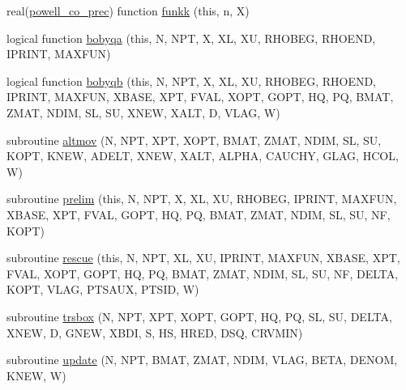 \begin{DoxyCompactItemize}
\item 
real(\mbox{\hyperlink{namespacepowell__constrainedoptimize_a18207be3e2f370a42332601cfccca22e}{powell\+\_\+co\+\_\+prec}}) function \mbox{\hyperlink{namespacepowell__constrainedoptimize_ae7f7153e98c2ba47f65f71c04dfdc6b6}{funkk}} (this, n, X)
\item 
logical function \mbox{\hyperlink{namespacepowell__constrainedoptimize_a18b806fe9f14b759021a23344e46743a}{bobyqa}} (this, N, N\+PT, X, XL, XU, R\+H\+O\+B\+EG, R\+H\+O\+E\+ND, I\+P\+R\+I\+NT, M\+A\+X\+F\+UN)
\item 
logical function \mbox{\hyperlink{namespacepowell__constrainedoptimize_a7c19fea82c74411b0aa5dc322b397049}{bobyqb}} (this, N, N\+PT, X, XL, XU, R\+H\+O\+B\+EG, R\+H\+O\+E\+ND, I\+P\+R\+I\+NT, M\+A\+X\+F\+UN, X\+B\+A\+SE, X\+PT, F\+V\+AL, X\+O\+PT, G\+O\+PT, HQ, PQ, B\+M\+AT, Z\+M\+AT, N\+D\+IM, SL, SU, X\+N\+EW, X\+A\+LT, D, V\+L\+AG, W)
\item 
subroutine \mbox{\hyperlink{namespacepowell__constrainedoptimize_ad592264ce63370c7014ab5883330e26d}{altmov}} (N, N\+PT, X\+PT, X\+O\+PT, B\+M\+AT, Z\+M\+AT, N\+D\+IM, SL, SU, K\+O\+PT, K\+N\+EW, A\+D\+E\+LT, X\+N\+EW, X\+A\+LT, A\+L\+P\+HA, C\+A\+U\+C\+HY, G\+L\+AG, H\+C\+OL, W)
\item 
subroutine \mbox{\hyperlink{namespacepowell__constrainedoptimize_a8e5256bd13e2e03b0e1dda0e1ff3ef1f}{prelim}} (this, N, N\+PT, X, XL, XU, R\+H\+O\+B\+EG, I\+P\+R\+I\+NT, M\+A\+X\+F\+UN, X\+B\+A\+SE, X\+PT, F\+V\+AL, G\+O\+PT, HQ, PQ, B\+M\+AT, Z\+M\+AT, N\+D\+IM, SL, SU, NF, K\+O\+PT)
\item 
subroutine \mbox{\hyperlink{namespacepowell__constrainedoptimize_a2a5e8cfa32743f237ece75e1b4d00469}{rescue}} (this, N, N\+PT, XL, XU, I\+P\+R\+I\+NT, M\+A\+X\+F\+UN, X\+B\+A\+SE, X\+PT, F\+V\+AL, X\+O\+PT, G\+O\+PT, HQ, PQ, B\+M\+AT, Z\+M\+AT, N\+D\+IM, SL, SU, NF, D\+E\+L\+TA, K\+O\+PT, V\+L\+AG, P\+T\+S\+A\+UX, P\+T\+S\+ID, W)
\item 
subroutine \mbox{\hyperlink{namespacepowell__constrainedoptimize_a8d96126f07f9d909b52d61690eaa4c80}{trsbox}} (N, N\+PT, X\+PT, X\+O\+PT, G\+O\+PT, HQ, PQ, SL, SU, D\+E\+L\+TA, X\+N\+EW, D, G\+N\+EW, X\+B\+DI, S, HS, H\+R\+ED, D\+SQ, C\+R\+V\+M\+IN)
\item 
subroutine \mbox{\hyperlink{namespacepowell__constrainedoptimize_aea17c033c10b38991c1484dfd380b3b1}{update}} (N, N\+PT, B\+M\+AT, Z\+M\+AT, N\+D\+IM, V\+L\+AG, B\+E\+TA, D\+E\+N\+OM, K\+N\+EW, W)
\end{DoxyCompactItemize}
